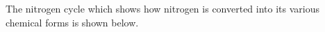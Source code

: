 					      The nitrogen cycle which shows how nitrogen is converted into its various chemical forms is shown below.
					      
					      
